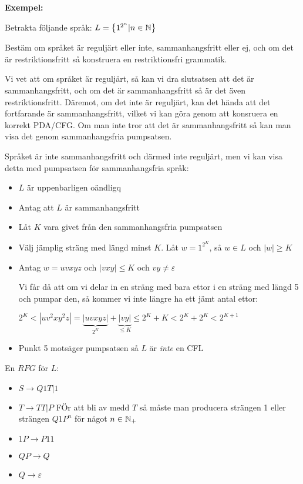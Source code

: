 \par\bigskip
\noindent\textbf{Exempel:}\par
\noindent Betrakta följande språk: $L = \left\{1^{2^n}|n\in\mathbb{N}\right\}$\par
\noindent Bestäm om språket är reguljärt eller inte, sammanhangsfritt eller ej, och om det är restriktionsfritt så konstruera en restriktionsfri grammatik.
\par\bigskip
\noindent Vi vet att om språket är reguljärt, så kan vi dra slutsatsen att det är sammanhangsfritt, och om det är sammanhangsfritt så är det även restriktionsfritt. Däremot, om det inte är reguljärt, kan det hända att det fortfarande är sammanhangsfritt, vilket vi kan göra genom att konsruera en korrekt PDA/CFG. Om man inte tror att det är sammanhangsfritt så kan man visa det genom sammanhangsfria pumpsatsen. 
\par\bigskip
\noindent Språket är inte sammanhangsfritt och därmed inte reguljärt, men vi kan visa detta med pumpsatsen för sammanhangsfria språk:
\begin{itemize}
  \item $L$ är uppenbarligen oändligq
  \item Antag att $L$ är sammanhangsfritt
  \item Låt $K$ vara givet från den sammanhangsfria pumpsatsen
  \item Välj jämplig sträng med längd minst $K$. Låt $w = 1^{2^K}$, så $w\in L$ och $\left|w\right|\geq K$
  \item Antag $w = uvxyz$ och $\left|vxy\right|\leq K$ och $vy\neq\varepsilon$\par
    \noindent Vi får då att om vi delar in en sträng med bara ettor i en sträng med längd 5 och pumpar den, så kommer vi inte längre ha ett jämt antal ettor:\par
    \noindent $2^K<\left|uv^2xy^2z\right| = \underbrace{\left|uvxyz\right|}_{\text{$2^K$}}+\underbrace{\left|vy\right|}_{\text{$\leq K$}} \leq 2^K+K<2^K+2^K<2^{K+1}$
  \item Punkt 5 motsäger pumpsatsen så $L$ är \textit{inte} en CFL
\end{itemize}
\par\bigskip
\noindent En $RFG$ för $L$:
\begin{itemize}
  \item $S\to Q1T|1$
  \item $T\to TT|P$ FÖr att bli av medd $T$ så måste man producera strängen 1 eller strängen $Q1P^n$ för något $n\in\mathbb{N}_+$
  \item $1P\to P11$
  \item $QP\to Q$
  \item $Q\to\varepsilon$
\end{itemize}
